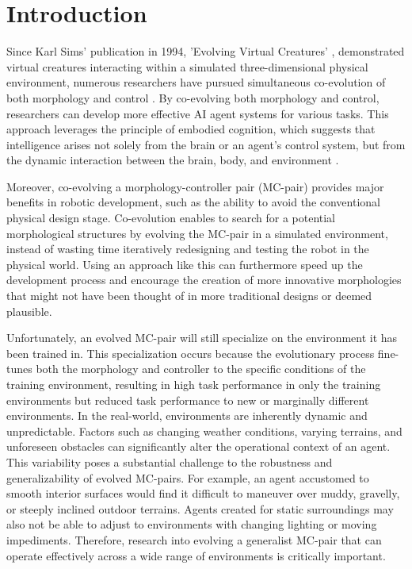 \section{Introduction}
Since Karl Sims' publication in 1994, 'Evolving Virtual Creatures' \cite{Karl_Sims_1994}, demonstrated virtual creatures interacting within a simulated three-dimensional physical environment, numerous researchers have pursued simultaneous co-evolution of both morphology and control \cite{Cheney_2017,Emma_Stensby_2021,Joshua_Auerbach_2014,Luis_2024}. By co-evolving both morphology and control, researchers can develop more effective AI agent systems for various tasks. This approach leverages the principle of embodied cognition, which suggests that intelligence arises not solely from the brain or an agent's control system, but from the dynamic interaction between the brain, body, and environment \cite{Josh_Bongard_2013}.

Moreover, co-evolving a morphology-controller pair (MC-pair) provides major benefits in robotic development, such as the ability to avoid the conventional physical design stage. Co-evolution enables to search for a potential morphological structures by evolving the MC-pair in a simulated environment, instead of wasting time iteratively redesigning and testing the robot in the physical world. Using an approach like this can furthermore speed up the development process and encourage the creation of more innovative morphologies that might not have been thought of in more traditional designs or deemed plausible.

Unfortunately, an evolved MC-pair will still specialize on the environment it has been trained in. This specialization occurs because the evolutionary process fine-tunes both the morphology and controller to the specific conditions of the training environment, resulting in high task performance in only the training environments but reduced task performance to new or marginally different environments. In the real-world, environments are inherently dynamic and unpredictable. Factors such as changing weather conditions, varying terrains, and unforeseen obstacles can significantly alter the operational context of an agent. This variability poses a substantial challenge to the robustness and generalizability of evolved MC-pairs. For example, an agent accustomed to smooth interior surfaces would find it difficult to maneuver over muddy, gravelly, or steeply inclined outdoor terrains. Agents created for static surroundings may also not be able to adjust to environments with changing lighting or moving impediments. Therefore, research into evolving a generalist MC-pair that can operate effectively across a wide range of environments is critically important.

